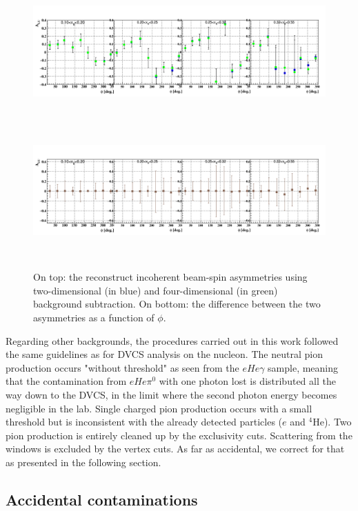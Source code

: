     \begin{figure}[tbp]
       \centering
    \includegraphics[height=5.2cm]{fig_rtpc/updates/BSA_InCoherent_xB.png}
    \includegraphics[height=5.2cm]{fig_rtpc/updates/diff_BSA_InCoherent_xB_2.png}
    \caption{On top: the reconstruct incoherent beam-spin asymmetries using    
    two-dimensional (in blue) and four-dimensional (in green) background 
 subtraction.  On bottom: the difference between the two asymmetries as a 
 function of $\phi$.}
    \label{fig:incoh_binning}
    \end{figure}                                                                  

  
Regarding other backgrounds, the procedures carried out in this work followed 
the same guidelines as for DVCS analysis on the nucleon. The neutral pion 
production occurs "without threshold" as seen from the $eHe\gamma$ sample, 
meaning that the contamination from $eHe\pi^0$ with one photon lost is 
distributed all the way down to the DVCS, in the limit where the second photon 
energy becomes negligible in the lab. Single charged pion production occurs 
with a small threshold but is inconsistent with the already detected particles 
($e$ and $^{4}$He). Two pion production is entirely cleaned up by the 
exclusivity cuts. Scattering from the windows is excluded by the vertex cuts.  
As far as accidental, we correct for that as presented in the following 
section.   


\subsection{Accidental contaminations}
~\\

